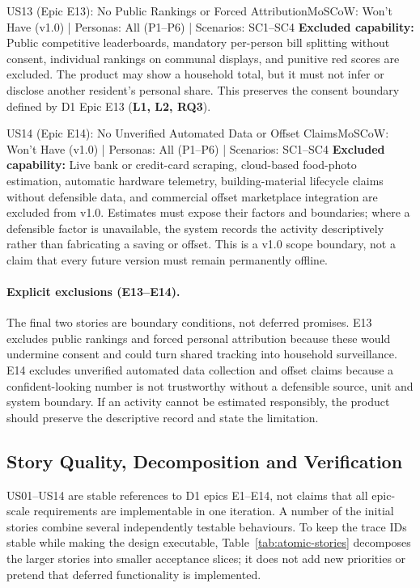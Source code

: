 \documentclass[12pt,a4paper]{article}
\begin{document}
\begin{storybox}{US13 (Epic E13): No Public Rankings or Forced Attribution}{MoSCoW: Won't Have (v1.0) | Personas: All (P1--P6) | Scenarios: SC1--SC4}
\textbf{Excluded capability:} Public competitive leaderboards, mandatory per-person bill splitting without consent, individual rankings on communal displays, and punitive red scores are excluded. The product may show a household total, but it must not infer or disclose another resident's personal share. This preserves the consent boundary defined by D1 Epic E13 (\textbf{L1, L2, RQ3}).
\end{storybox}

\begin{storybox}{US14 (Epic E14): No Unverified Automated Data or Offset Claims}{MoSCoW: Won't Have (v1.0) | Personas: All (P1--P6) | Scenarios: SC1--SC4}
\textbf{Excluded capability:} Live bank or credit-card scraping, cloud-based food-photo estimation, automatic hardware telemetry, building-material lifecycle claims without defensible data, and commercial offset marketplace integration are excluded from v1.0. Estimates must expose their factors and boundaries; where a defensible factor is unavailable, the system records the activity descriptively rather than fabricating a saving or offset. This is a v1.0 scope boundary, not a claim that every future version must remain permanently offline.
\end{storybox}

\paragraph{Explicit exclusions (E13--E14).}
The final two stories are boundary conditions, not deferred promises. E13 excludes public rankings and forced personal attribution because these would undermine consent and could turn shared tracking into household surveillance. E14 excludes unverified automated data collection and offset claims because a confident-looking number is not trustworthy without a defensible source, unit and system boundary. If an activity cannot be estimated responsibly, the product should preserve the descriptive record and state the limitation.

\clearpage


\subsection{Story Quality, Decomposition and Verification}
US01--US14 are stable references to D1 epics E1--E14, not claims that all epic-scale requirements are implementable in one iteration. A number of the initial stories combine several independently testable behaviours. To keep the trace IDs stable while making the design executable, Table~\ref{tab:atomic-stories} decomposes the larger stories into smaller acceptance slices; it does not add new priorities or pretend that deferred functionality is implemented.
\end{document}
